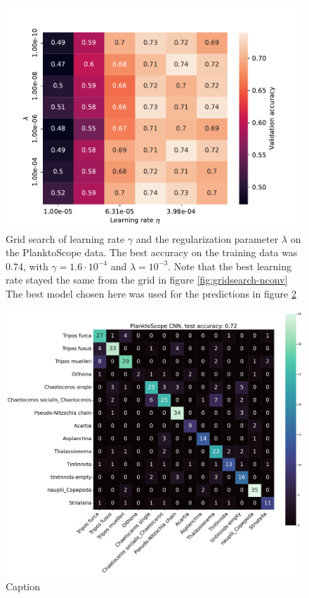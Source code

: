\begin{figure}
    \centering
    \includegraphics[width=\linewidth]{examples/tests_even/figs/gridsearch-128-2024-12-06_1241.pdf}
    \caption{Grid search of learning rate $\gamma$ and the regularization parameter $\lambda$ on the PlanktoScope data. The best accuracy on the training data was 0.74, with $\gamma = 1.6 \cdot 10^{-4}$ and $\lambda=10^{-3}$. Note that the best learning rate stayed the same from the grid in figure \ref{fig:gridsearch-nconv} The best model chosen here was used for the predictions in figure \ref{fig:confusion-planktoscope}}
    \label{fig:gridsearch-planktoscope}
\end{figure}

\begin{figure}
    \centering
    \includegraphics[width=\linewidth]{examples/tests_even/figs/confusion-matrix-2024-12-06_1241.pdf}
    \caption{Caption}
    \label{fig:confusion-planktoscope}
\end{figure}

